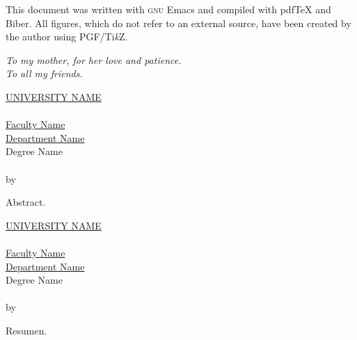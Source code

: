 \noindent This document was written with \textsc{gnu} Emacs and compiled with
pdf\TeX{} and Biber. All figures, which do not refer to an external source,
have been created by the author using PGF/Ti\emph{k}Z.

\doclicenseThis
\normalsize


\cleardoublepage
\thispagestyle{empty}
\begin{flushright}
  \itshape
  To my mother, for her love and patience. \\
  To all my friends.
\end{flushright}


\cleardoublepage
\thispagestyle{plain}
\null\vfill
\begin{center}
  \makeatletter
  \MakeUppercase{\href{https://href.com}{University Name}} \\
  \vspace{20pt}
  {\huge \textit{\abstractname}} \\
  \bigskip
  \href{https://href.com}{Faculty Name} \\
  \href{https://href.com}{Department Name} \\
  \bigskip
  Degree Name \\
  \bigskip
  \textbf{\@title} \\
  \medskip
  by \@author \\
  \bigskip
  \makeatother
\end{center}
Abstract.
\vfill\null


\clearpage
\thispagestyle{plain}
\null\vfill
\begin{otherlanguage}{spanish}
  \begin{center}
    \makeatletter
    \MakeUppercase{\href{https://href.com}{University Name}} \\
    \vspace{20pt}
    {\huge \textit{\abstractname}} \\
    \bigskip
    \href{https://href.com}{Faculty Name} \\
    \href{https://href.com}{Department Name} \\
    \bigskip
    Degree Name \\
    \bigskip
    \textbf{\@title} \\
    \medskip
    by \@author \\
    \bigskip
    \makeatother
  \end{center}
  Resumen.
\end{otherlanguage}
\vfill\null


